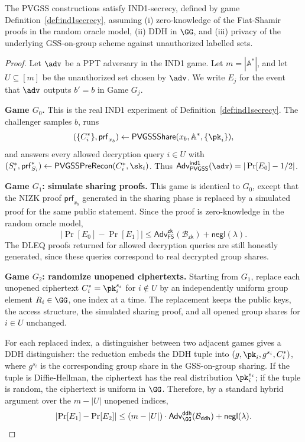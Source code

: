 \documentclass[runningheads]{llncs}
\newcommand{\pvgssShare}{\mathsf{PVGSSShare}}
\newcommand{\pvgssPreRecon}{\mathsf{PVGSSPreRecon}}
\newcommand{\proofs}{\mathsf{prf}}
\begin{document}
\begin{theorem}\label{theo:ind1secrecy}
The PVGSS constructions satisfy IND1-secrecy, defined by game Definition~\ref{def:ind1secrecy}, assuming (i) zero-knowledge of the Fiat-Shamir proofs in the random oracle model, (ii) DDH in \(\GG\), and (iii) privacy of the underlying GSS-on-group scheme against unauthorized labelled sets.
\end{theorem}
\begin{proof}
Let \(\adv\) be a PPT adversary in the IND1 game. Let \(m=|\mathbb{A}^*|\), and let \(U\subseteq[m]\) be the unauthorized set chosen by \(\adv\). We write \(E_j\) for the event that \(\adv\) outputs \(b'=b\) in Game \(G_j\).

\textbf{Game \(G_0\).} This is the real IND1 experiment of Definition~\ref{def:ind1secrecy}. The challenger samples \(b\), runs
\[
(\{C_i^*\},\proofs_{x_b})\gets \pvgssShare(x_b,\mathbb{A}^*,\{\pk_i\}),
\]
and answers every allowed decryption query \(i\in U\) with
\((S_i^*,\proofs_{S_i}^*)\gets\pvgssPreRecon(C_i^*,\sk_i)\).
Thus \(\mathsf{Adv}^{\mathsf{ind1}}_{\mathsf{PVGSS}}(\adv)=|\Pr[E_0]-1/2|\).

\textbf{Game \(G_1\): simulate sharing proofs.} This game is identical to \(G_0\), except that the NIZK proof \(\proofs_{x_b}\) generated in the sharing phase is replaced by a simulated proof for the same public statement. Since the proof is zero-knowledge in the random oracle model,
\[
\left|\Pr[E_0]-\Pr[E_1]\right|
\leq
\mathsf{Adv}^{\mathsf{zk}}_{\mathsf{FS}}(\mathcal{B}_{\mathsf{zk}})
+\mathsf{negl}(\lambda).
\]
The DLEQ proofs returned for allowed decryption queries are still honestly generated, since these queries correspond to real decrypted group shares.

\textbf{Game \(G_2\): randomize unopened ciphertexts.} Starting from \(G_1\), replace each unopened ciphertext \(C_i^*=\pk_i^{s_i}\) for \(i\notin U\) by an independently uniform group element \(R_i\in\GG\), one index at a time. The replacement keeps the public keys, the access structure, the simulated sharing proof, and all opened group shares for \(i\in U\) unchanged.

For each replaced index, a distinguisher between two adjacent games gives a DDH distinguisher: the reduction embeds the DDH tuple into \((g,\pk_i,g^{s_i},C_i^*)\), where \(g^{s_i}\) is the corresponding group share in the GSS-on-group sharing. If the tuple is Diffie-Hellman, the ciphertext has the real distribution \(\pk_i^{s_i}\); if the tuple is random, the ciphertext is uniform in \(\GG\). Therefore, by a standard hybrid argument over the \(m-|U|\) unopened indices,
\[
\left|\Pr[E_1]-\Pr[E_2]\right|
\leq
(m-|U|)\cdot \mathsf{Adv}^{\mathsf{ddh}}_{\GG}(\mathcal{B}_{\mathsf{ddh}})
+\mathsf{negl}(\lambda).
\]


\end{proof}
\end{document}
